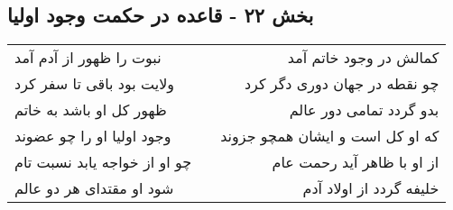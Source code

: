 \begin{center}
\section*{بخش ۲۲ - قاعده در حکمت وجود اولیا}
\label{sec:sh022}
\begin{longtable}{l p{0.5cm} r}
نبوت را ظهور از آدم آمد
&&
کمالش در وجود خاتم آمد
\\
ولایت بود باقی تا سفر کرد
&&
چو نقطه در جهان دوری دگر کرد
\\
ظهور کل او باشد به خاتم
&&
بدو گردد تمامی دور عالم
\\
وجود اولیا او را چو عضوند
&&
که او کل است و ایشان همچو جزوند
\\
چو او از خواجه یابد نسبت تام
&&
از او با ظاهر آید رحمت عام
\\
شود او مقتدای هر دو عالم
&&
خلیفه گردد از اولاد آدم
\\
\end{longtable}
\end{center}
